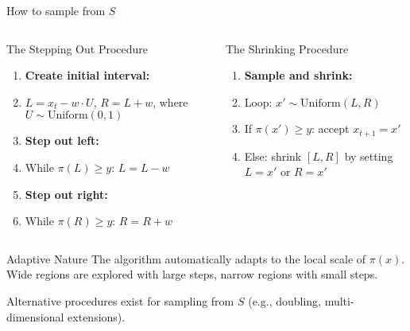 \documentclass[aspectratio=169]{beamer}
\begin{document}
\begin{frame}{How to sample from $S$}

	\begin{columns}[T]
		\begin{column}{0.48\textwidth}
			\begin{block}{The Stepping Out Procedure}
				\begin{enumerate}
					\item \textbf{Create initial interval:}
					\item $L = x_t - w \cdot U$, $R = L + w$, where $U \sim \text{Uniform}(0,1)$
					\item \textbf{Step out left:}
					\item While $\pi(L) \geq y$: $L = L - w$
					\item \textbf{Step out right:}
					\item While $\pi(R) \geq y$: $R = R + w$
				\end{enumerate}
			\end{block}
		\end{column}
		\begin{column}{0.48\textwidth}
			\begin{block}{The Shrinking Procedure}
				\begin{enumerate}
					\item \textbf{Sample and shrink:}
					\item Loop: $x' \sim \text{Uniform}(L, R)$
					\item If $\pi(x') \geq y$: accept $x_{t+1} = x'$
					\item Else: shrink $[L,R]$ by setting $L = x'$ or $R = x'$
				\end{enumerate}
			\end{block}
		\end{column}
	\end{columns}

	\begin{alertblock}{Adaptive Nature}
		The algorithm automatically adapts to the local scale of $\pi(x)$. Wide regions are explored with large steps, narrow regions with small steps.
	\end{alertblock}
	Alternative procedures exist for sampling from $S$ (e.g., doubling, multi-dimensional extensions).

\end{frame}
\end{document}
